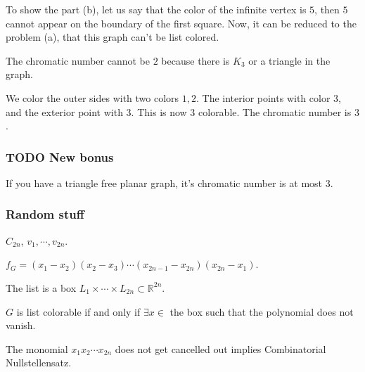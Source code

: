 \documentclass[11pt]{article}
\def\R{\mathbb{R}}
\begin{document}
To show the part (b), let us say that the color of the infinite vertex is
\(5\), then \(5\) cannot appear on the boundary of the first square. Now, it can
be reduced to the problem (a), that this graph can't be list colored.

The chromatic number cannot be \(2\) because there is \(K_3\) or a triangle in
the graph.

We color the outer sides with two colors \(1, 2\). The interior points with
color \(3\), and the exterior point with \(3\). This is now \(3\) colorable. The
chromatic number is \(3\).
\subsubsection{{\bfseries\sffamily TODO} New bonus}
\label{sec:orgd64c2b8}
If you have a triangle free planar graph, it's chromatic number is at most \(3\).
\subsubsection{Random stuff}
\label{sec:org99c6fdf}
\(C_{2n}\), \(v_1, \cdots, v_{2n}\).

\(f_G = (x_1 -x_2)(x_2 - x_3) \cdots (x_{2n-1} - x_{2n})(x_{2n} - x_1)\).

The list is a box \(L_1 \times \cdots \times L_{2n} \subset \R^{2n}\).

\(G\) is list colorable if and only if \(\exists x \in\) the box such that the
polynomial does not vanish.

The monomial \(x_1x_2\cdots x_{2n}\) does not get cancelled out implies
Combinatorial Nullstellensatz.
\end{document}
